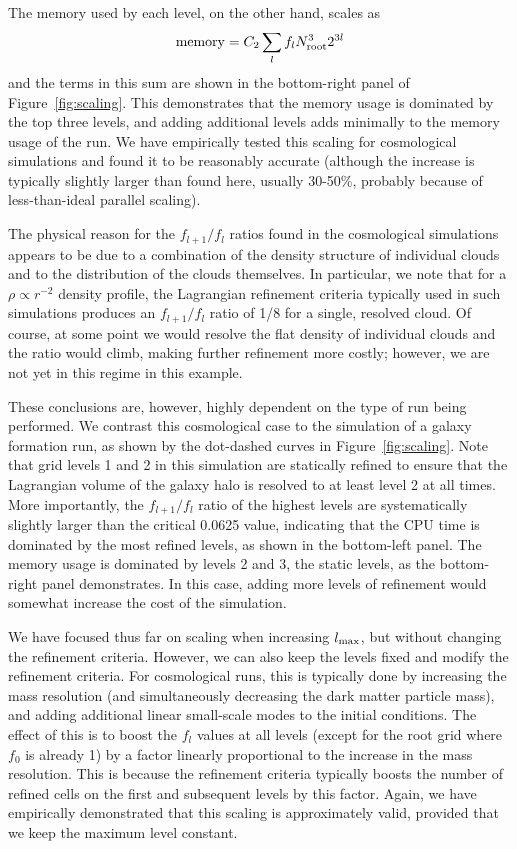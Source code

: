 The memory used by each level, on the other hand, scales as
\begin{equation}
{\rm memory} = C_2 \sum_l f_l N_{\rm root}^3 2^{3l}
\end{equation}
and the terms in this sum are shown in the bottom-right panel of
Figure~\ref{fig:scaling}.  This demonstrates that the memory usage is
dominated by the top three levels, and adding additional levels 
adds minimally to the memory usage of the run.  We have empirically
tested this scaling for cosmological simulations and found it to be
reasonably accurate (although the increase is typically slightly
larger than found here, usually 30-50\%, probably because of
less-than-ideal parallel scaling).

The physical reason for the $f_{l+1}/f_l$ ratios found in the
cosmological simulations appears to be due to a combination of the
density structure of individual clouds and to the distribution of the
clouds themselves.  In particular, we note that for a $\rho \propto
r^{-2}$ density profile, the Lagrangian refinement criteria typically used in
such simulations produces an $f_{l+1}/f_l$ ratio of 1/8 for a single,
resolved cloud.  Of course, at some point we would resolve the flat
density of individual clouds and the ratio would climb, making further
refinement more costly; however, we are not yet in this regime in this
example.

These conclusions are, however, highly dependent on the type of run
being performed.  We contrast this cosmological case to the simulation
of a galaxy formation run, as shown by the dot-dashed curves in
Figure~\ref{fig:scaling}.  Note that grid levels 1 and 2 in this simulation are statically
refined to ensure that the Lagrangian volume of the galaxy halo is resolved
to at least level 2 at all times. More importantly, the
$f_{l+1}/f_{l}$ ratio of the highest levels are systematically
slightly larger than the critical 0.0625 value, indicating that the
CPU time is dominated by the most refined levels, as shown in the
bottom-left panel.  The memory usage is dominated by levels 2 and 3,
the static levels, as the bottom-right panel demonstrates.  In this
case, adding more levels of refinement would somewhat increase the
cost of the simulation.

We have focused thus far on scaling when increasing $l_{\rm max}$, but
without changing the refinement criteria.  However, we can also keep
the levels fixed and modify the refinement criteria.  For cosmological
runs, this is typically done by increasing the mass resolution (and
simultaneously decreasing the dark matter particle mass), and adding
additional linear small-scale modes to the initial conditions.  The
effect of this is to boost the $f_l$ values at all levels (except for
the root grid where $f_0$ is already 1) by a factor linearly
proportional to the increase in the mass resolution.  This is because
the refinement criteria typically boosts the number of refined cells
on the first and subsequent levels by this factor.  Again, we have
empirically demonstrated that this scaling is approximately valid,
provided that we keep the maximum level constant.


